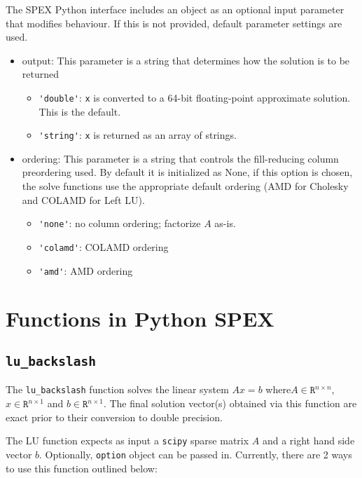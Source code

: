 \documentclass[12pt]{report}
\theoremstyle{definition}
\begin{document}
The SPEX Python interface includes an object as an optional input parameter that modifies behaviour. If this is not provided, default parameter settings are used.
\begin{itemize}
    \item output: This parameter is a string that determines how the solution is to be returned
    \begin{itemize}
        \item \verb|'double'|:  \verb|x| is converted to a 64-bit
            floating-point approximate solution.  This is the default.
        \item \verb|'string'|:  \verb|x| is returned as an array of strings.
    \end{itemize}
    \item ordering: This parameter is a string that controls the fill-reducing column preordering used. By default it is initialized as None, if this option is chosen, the solve functions use the appropriate default ordering (AMD for Cholesky and COLAMD for Left LU).
        \begin{itemize}
            \item \verb|'none'|: no column ordering; factorize $A$ as-is.
            \item \verb|'colamd'|: COLAMD ordering 
            \item \verb|'amd'|: AMD ordering 
        \end{itemize}
\end{itemize}

\section{Functions in Python SPEX}\label{s:Python:Funcs}

\subsection{\texttt{lu\_backslash}}

The \verb|lu_backslash| function solves the linear system $Ax=b$ where$A \in \mathtt{R}^{n \times n}$, $x \in \mathtt{R}^{n \times 1}$ and $b \in \mathtt{R}^{n \times 1}$. The final solution vector(s) obtained via this function are exact prior to their conversion to double precision. 

The LU function expects as input a \verb|scipy| sparse matrix $A$ and a right hand side vector $b$. Optionally, \verb|option| object can be passed in.
Currently, there are 2 ways to use this function outlined below:
\end{document}
